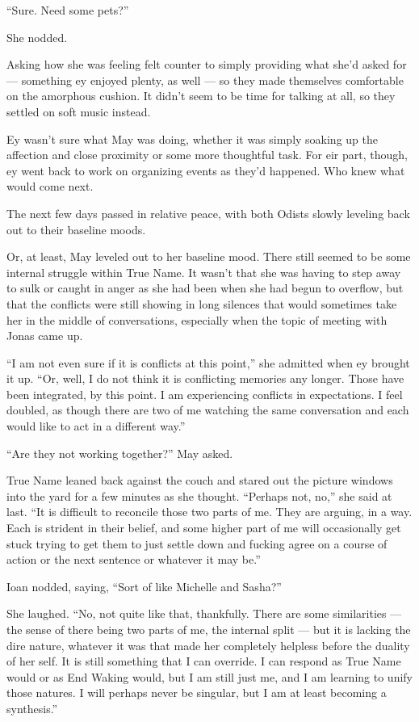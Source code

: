 ``Sure. Need some pets?''

She nodded.

Asking how she was feeling felt counter to simply providing what she'd asked for — something ey enjoyed plenty, as well — so they made themselves comfortable on the amorphous cushion. It didn't seem to be time for talking at all, so they settled on soft music instead.

Ey wasn't sure what May was doing, whether it was simply soaking up the affection and close proximity or some more thoughtful task. For eir part, though, ey went back to work on organizing events as they'd happened. Who knew what would come next.

The next few days passed in relative peace, with both Odists slowly leveling back out to their baseline moods.

Or, at least, May leveled out to her baseline mood. There still seemed to be some internal struggle within True Name. It wasn't that she was having to step away to sulk or caught in anger as she had been when she had begun to overflow, but that the conflicts were still showing in long silences that would sometimes take her in the middle of conversations, especially when the topic of meeting with Jonas came up.

``I am not even sure if it is conflicts at this point,'' she admitted when ey brought it up. ``Or, well, I do not think it is conflicting memories any longer. Those have been integrated, by this point. I am experiencing conflicts in expectations. I feel doubled, as though there are two of me watching the same conversation and each would like to act in a different way.''

``Are they not working together?'' May asked.

True Name leaned back against the couch and stared out the picture windows into the yard for a few minutes as she thought. ``Perhaps not, no,'' she said at last. ``It is difficult to reconcile those two parts of me. They are arguing, in a way. Each is strident in their belief, and some higher part of me will occasionally get stuck trying to get them to just settle down and fucking agree on a course of action or the next sentence or whatever it may be.''

Ioan nodded, saying, ``Sort of like Michelle and Sasha?''

She laughed. ``No, not quite like that, thankfully. There are some similarities — the sense of there being two parts of me, the internal split — but it is lacking the dire nature, whatever it was that made her completely helpless before the duality of her self. It is still something that I can override. I can respond as True Name would or as End Waking would, but I am still just me, and I am learning to unify those natures. I will perhaps never be singular, but I am at least becoming a synthesis.''

